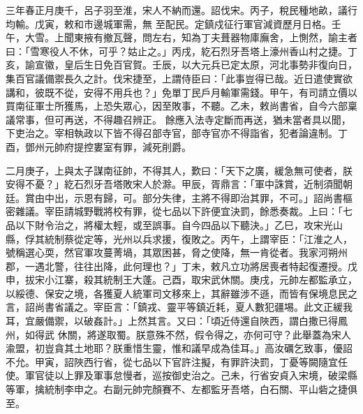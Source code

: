 \begin{pinyinscope}
 三年春正月庚千，呂子羽至淮，宋人不納而還。詔伐宋。丙子，稅民種地畝，議行均輸。戊寅，敕和市邊城軍需，無
 至配民。定鎮戍征行軍官減資歷月日格。壬午，大雪。上聞東掖有撤瓦聲，問左右，知為丁夫葺器物庫廡舍，上惻然，諭主者曰：「雪寒役人不休，可乎？姑止之。」丙戌，紇石烈牙吾塔上濠州香山村之捷。丁亥，諭宣徽，皇后生日免百官賀。壬辰，以大元兵已定太原，河北事勢非復向日，集百官議備禦長久之計。伐宋捷至，上謂侍臣曰：「此事豈得已哉。近日遣使實欲講和，彼既不從，安得不用兵也？」免單丁民戶月輸軍需錢。甲午，有司請立價以買南征軍士所獲馬，上恐失眾心，因至敗事，不聽。乙未，敕尚書省，自今六部稟議常事，但可再送，不得趣召辨正。
 餘應入法寺定斷而再送，猶未當者具以聞，下吏治之。宰相執政以下皆不得召部寺官，部寺官亦不得詣省，犯者論違制。丁酉，鄧州元帥府提控婁室有罪，減死削爵。



 二月庚子，上與太子謀南征帥，不得其人，歎曰：「天下之廣，緩急無可使者，朕安得不憂？」紇石烈牙吾塔敗宋人於滁。甲辰，胥鼎言：「軍中誅賞，近制須聞朝廷。賞由中出，示恩有歸，可。部分失律，主將不得即治其罪，不可。」詔尚書樞密雜議。宰臣請城野戰將校有罪，從七品以下許便宜決罰，餘悉奏裁。上曰：「七品以下財令治之，將權太輕，或至誤事。自今四品以下聽決。」乙巳，攻宋光山
 縣，俘其統制蔡從定等，光州以兵求援，復敗之。丙午，上謂宰臣：「江淮之人，號稱選心耎，然官軍攻蔓菁堝，其眾困甚，脅之使降，無一肯從者。我家河朔州郡，一遇北警，往往出降，此何理也？」丁未，敕凡立功將居喪者特起復遷授。戊申，拔宋小江寨，殺其統制王大蓬。己酉，取宋武休關。庚戌，元帥左都監承立，以綏德、保安之境，各獲夏人統軍司文移來上，其辭雖涉不遜，而皆有保境息民之言，詔尚書省議之。宰臣言：「鎮戎、靈平等鎮近耗，夏人數犯疆埸。此文正緩我耳，宜嚴備禦，以破姦計。」上然其言。又曰：「頃近侍還自陜西，謂白撒已得鳳州，如得武
 休關，將遂取蜀。朕意殊不然，假令得之，亦何可守？此舉蓋為宋人渝盟，初豈貪其土地耶？朕重惜生靈，惟和議早成為佳耳。」高汝礪乞致事，優詔不允。甲寅，詔陜西行省，從七品以下官許注擬，有罪許決罰，丁憂等闕隨宜任使。軍官徒以上罪及軍事怠慢者，巡按御史治之。己未，行省安貞入宋境，破梁縣等軍，擒統制李申之。右副元帥完顏賽不、左都監牙吾塔，白石關、平山砦之捷俱至。




\end{pinyinscope}
